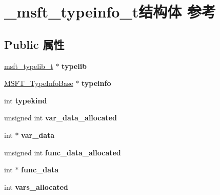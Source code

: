 \hypertarget{struct__msft__typeinfo__t}{}\section{\+\_\+msft\+\_\+typeinfo\+\_\+t结构体 参考}
\label{struct__msft__typeinfo__t}
\subsection*{Public 属性}
\begin{DoxyCompactItemize}
\item 
\mbox{\label{struct__msft__typeinfo__t_af24ee63c56b605dadbd88a08f5353fe9}} 
\hyperlink{struct__msft__typelib__t}{msft\+\_\+typelib\+\_\+t} $\ast$ {\bfseries typelib}
\item 
\mbox{\label{struct__msft__typeinfo__t_a2cc4a533186b9dc818ef38e498acb97c}} 
\hyperlink{structtag_m_s_f_t___type_info_base}{M\+S\+F\+T\+\_\+\+Type\+Info\+Base} $\ast$ {\bfseries typeinfo}
\item 
\mbox{\label{struct__msft__typeinfo__t_a0cafa1a21a99a99821c4d1c1e4b232c5}} 
int {\bfseries typekind}
\item 
\mbox{\label{struct__msft__typeinfo__t_a45b350b0c9d61b0182f18473c633b27f}} 
unsigned int {\bfseries var\+\_\+data\+\_\+allocated}
\item 
\mbox{\label{struct__msft__typeinfo__t_a290aebae611cd152c54dc3017f06cc5c}} 
int $\ast$ {\bfseries var\+\_\+data}
\item 
\mbox{\label{struct__msft__typeinfo__t_af21166962ef0279be43303e46c7aee02}} 
unsigned int {\bfseries func\+\_\+data\+\_\+allocated}
\item 
\mbox{\label{struct__msft__typeinfo__t_a857324f9ff406954d00e84fb48dadfb3}} 
int $\ast$ {\bfseries func\+\_\+data}
\item 
\mbox{\label{struct__msft__typeinfo__t_a5571ba601352cedf131363f60c298e8a}} 
int {\bfseries vars\+\_\+allocated}

\end{DoxyCompactItemize}
